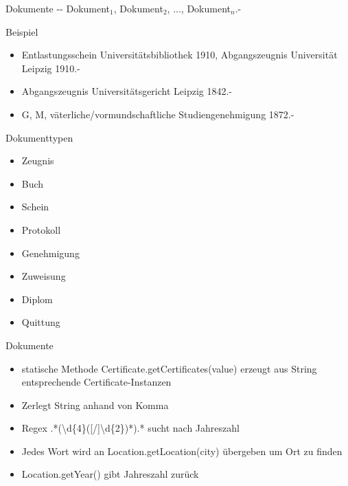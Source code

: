 \documentclass[12pt]{beamer}
\begin{document}
\begin{large}
\begin{frame}{Dokumente}
 -{}- Dokument$_1$, Dokument$_2$, ..., Dokument$_n$.-

 \vspace*{\fill}
 \begin{block}{Beispiel}
  \normalsize
  \begin{itemize}
   \item Entlastungsschein Universitätsbibliothek 1910, Abgangszeugnis Universität Leipzig 1910.-
   \item Abgangszeugnis Universitätsgericht Leipzig 1842.-
   \item G, M, väterliche/vormundschaftliche Studiengenehmigung 1872.-
  \end{itemize}
 \end{block}
\end{frame}

\begin{frame}{Dokumenttypen}
 \begin{itemize}
  \item Zeugnis
  \item Buch
  \item Schein
  \item Protokoll
  \item Genehmigung
  \item Zuweisung
  \item Diplom
  \item Quittung
 \end{itemize}
\end{frame}

\begin{frame}{Dokumente}
 \begin{itemize}
  \item statische Methode Certificate.getCertificates(value) erzeugt aus String entsprechende Certificate-Instanzen
  \item Zerlegt String anhand von Komma
  \item Regex .*(\textbackslash d\{4\}([/]\textbackslash d\{2\})*).* sucht nach Jahreszahl
  \item Jedes Wort wird an Location.getLocation(city) übergeben um Ort zu finden
  \item Location.getYear() gibt Jahreszahl zurück
 \end{itemize}
\end{frame}


\end{large}
\end{document}
